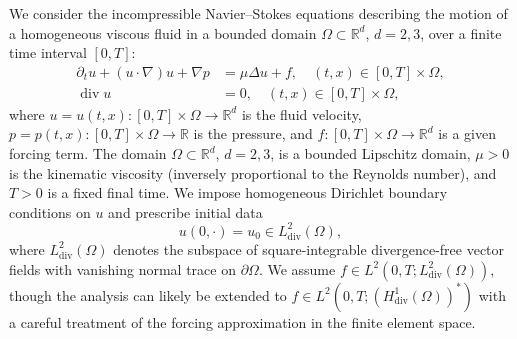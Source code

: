 \documentclass[10pt,letterpaper]{amsart}
\newcommand{\R}{\mathbb{R}}
\newcommand{\Div}{\operatorname{div}}
\newcommand{\dom}{\Omega}
\theoremstyle{definition}{\newtheorem{definition}[lemma]{Definition}}
\numberwithin{equation}{section}
\begin{document}
We consider the incompressible Navier–Stokes equations describing the motion of a homogeneous viscous fluid in a bounded domain $\dom \subset \R^d$, $d=2,3$, over a finite time interval $[0,T]$:
\begin{equation}
	\label{eq:NS}
	\begin{split}
		\partial_t u + (u\cdot\nabla)u + \nabla p &= \mu \Delta u + f,\quad (t,x)\in [0,T]\times\Omega,\\
		\Div u & = 0,\quad (t,x)\in [0,T]\times\Omega,
	\end{split}
\end{equation}
where $u=u(t,x):[0,T]\times\Omega \to \mathbb{R}^d$ is the fluid velocity, $p=p(t,x):[0,T]\times\Omega\to \mathbb{R}$ is the pressure, and $f:[0,T]\times\Omega\to \mathbb{R}^d$ is a given forcing term. The domain $\Omega\subset\mathbb{R}^d$, $d=2,3$, is a bounded Lipschitz domain, $\mu>0$ is the kinematic viscosity (inversely proportional to the Reynolds number), and $T>0$ is a fixed final time. We impose homogeneous Dirichlet boundary conditions on $u$ and prescribe initial data
\begin{equation*}
	u(0,\cdot)=u_0\in L^2_{\text{div}}(\dom),
\end{equation*} 
where $L^2_{\mathrm{div}}(\Omega)$ denotes the subspace of square-integrable divergence-free vector fields with vanishing normal trace on $\partial\Omega$. We assume $f\in L^2(0,T;L^2_{\mathrm{div}}(\Omega))$, though the analysis can likely be extended to $f\in L^2(0,T;(H^1_{\mathrm{div}}(\Omega))^*)$ with a careful treatment of the forcing approximation in the finite element space.
\end{document}
